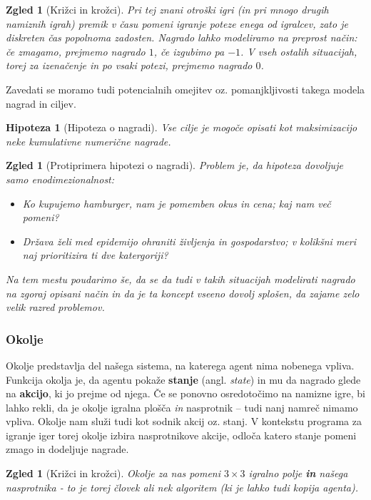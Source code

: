 \documentclass[12pt,a4paper]{amsart}
\theoremstyle{definition} %
\theoremstyle{plain} %
\newtheorem{zgled}[definicija]{Zgled}
\newtheorem{hipoteza}[definicija]{Hipoteza}
\begin{document}
\begin{zgled}[Križci in krožci]
    Pri tej znani otroški igri (in pri mnogo drugih namiznih igrah) premik v času pomeni 
    igranje poteze enega od igralcev, zato je diskreten čas popolnoma zadosten. Nagrado lahko
    modeliramo na preprost način: če zmagamo, prejmemo nagrado $1$, če izgubimo pa $-1$. 
    V vseh ostalih situacijah, torej za izenačenje in po vsaki potezi, prejmemo nagrado $0$.
\end{zgled}

Zavedati se moramo tudi potencialnih omejitev oz. pomanjkljivosti takega modela nagrad in ciljev. 
\begin{hipoteza}[Hipoteza o nagradi]
    Vse cilje je mogoče opisati kot maksimizacijo neke kumulativne numerične 
    nagrade.
\end{hipoteza}

\begin{zgled}[Protiprimera hipotezi o nagradi]
    Problem je, da hipoteza dovoljuje samo enodimezionalnost:
    \begin{itemize}
        \item Ko kupujemo hamburger, nam je pomemben okus in cena; kaj nam več pomeni?
        \item Država želi med epidemijo ohraniti življenja in gospodarstvo; v kolikšni 
                meri naj prioritizira ti dve katergoriji?
    \end{itemize}
    Na tem mestu poudarimo še, da se da tudi v takih situacijah modelirati nagrado na zgoraj 
    opisani način in da je ta koncept vseeno dovolj splošen, da zajame zelo velik razred problemov.
    
\end{zgled}

\subsubsection{Okolje}
Okolje predstavlja del našega sistema, na katerega agent nima nobenega vpliva. Funkcija okolja
je, da agentu pokaže \textbf{stanje} (angl. \textit{state}) in mu da nagrado glede na 
\textbf{akcijo}, ki jo prejme od njega. Če se ponovno osredotočimo na namizne igre, bi lahko rekli, 
da je okolje igralna plošča \textit{in} nasprotnik  -- tudi nanj namreč nimamo vpliva. Okolje nam 
služi tudi kot sodnik akcij oz. stanj. V kontekstu programa za igranje iger torej okolje izbira 
nasprotnikove akcije, odloča katero stanje pomeni zmago in dodeljuje nagrade.

\begin{zgled}[Križci in krožci]
    Okolje za nas pomeni $3\times3$ igralno polje \textbf{in} našega nasprotnika - to je torej človek 
    ali nek algoritem (ki je lahko tudi kopija agenta).
\end{zgled}
\end{document}
